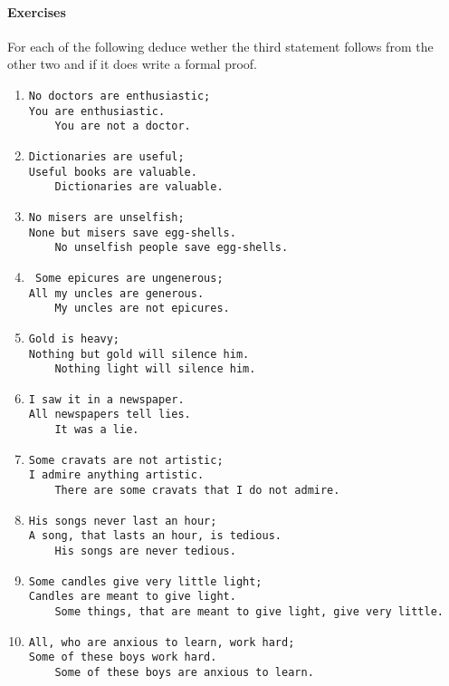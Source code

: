  \paragraph{\bf Exercises}
 For each of the following deduce wether the third statement follows from the other two and if it does write a formal proof.
 \begin{enumerate}
 \item  \begin{verbatim}
No doctors are enthusiastic;
You are enthusiastic.
    You are not a doctor.\end{verbatim}
 \item \begin{verbatim}
Dictionaries are useful;
Useful books are valuable.
    Dictionaries are valuable.\end{verbatim}
 \item \begin{verbatim}
No misers are unselfish;
None but misers save egg-shells.
    No unselfish people save egg-shells.\end{verbatim}
 \item \begin{verbatim}
 Some epicures are ungenerous;
All my uncles are generous.
    My uncles are not epicures.\end{verbatim}
\item \begin{verbatim}
Gold is heavy;
Nothing but gold will silence him.
    Nothing light will silence him.\end{verbatim}
 \item\begin{verbatim}    
I saw it in a newspaper.
All newspapers tell lies.
    It was a lie.\end{verbatim}
 \item\begin{verbatim}
Some cravats are not artistic;
I admire anything artistic.
    There are some cravats that I do not admire.\end{verbatim}
 \item\begin{verbatim}
His songs never last an hour;
A song, that lasts an hour, is tedious.
    His songs are never tedious.\end{verbatim}
 \item\begin{verbatim}
Some candles give very little light;
Candles are meant to give light.
    Some things, that are meant to give light, give very little.\end{verbatim}
 \item\begin{verbatim}
All, who are anxious to learn, work hard;
Some of these boys work hard.
    Some of these boys are anxious to learn.\end{verbatim}
\end{enumerate}





